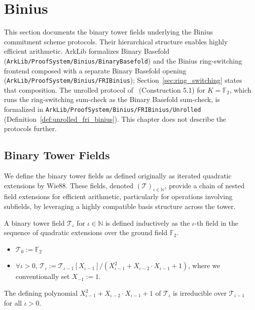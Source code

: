 \section{Binius}\label{sec:binius}

This section documents the binary tower fields underlying the Binius commitment scheme protocols. Their hierarchical structure enables highly efficient arithmetic. ArkLib formalizes Binary Basefold (\texttt{ArkLib/ProofSystem/Binius/BinaryBasefold}) and the Binius ring-switching frontend composed with a separate Binary Basefold opening (\texttt{ArkLib/ProofSystem/Binius/FRIBinius}); Section~\ref{sec:ring_switching} states that composition. The unrolled protocol of~\cite{DP24} (Construction 5.1) for $K = \mathbb{F}_2$, which runs the ring-switching sum-check as the Binary Basefold sum-check, is formalized in \texttt{ArkLib/ProofSystem/Binius/FRIBinius/Unrolled} (Definition~\ref{def:unrolled_fri_binius}). This chapter does not describe the protocols further.

\subsection{Binary Tower Fields}

We define the binary tower fields \cite{DP25} as defined originally as iterated quadratic extensions by Wie88\cite{Wie88}. These fields, denoted $(\mathcal{T})_{\iota \in \mathbb{N}}$, provide a chain of nested field extensions for efficient arithmetic, particularly for operations involving subfields, by leveraging a highly compatible basis structure across the tower.

\begin{definition}
    \leanok
    \label{def:binary_tower_field}
    A binary tower field $\mathcal{T}_{\iota}$ for $\iota \in \mathbb{N}$ is defined inductively as the $\iota$-th field in the sequence of quadratic extensions over the ground field $\mathbb{F}_2$.
    \begin{itemize}
        \item $\mathcal{T}_{0} := \mathbb{F}_{2}$
        \item $\forall \iota > 0$, $\mathcal{T}_{\iota} := \mathcal{T}_{\iota-1}[X_{\iota-1}] / (X_{\iota-1}^{2}+X_{\iota-2} \cdot X_{\iota-1}+1)$, where we conventionally set $X_{-1} := 1$.
    \end{itemize}
\end{definition}

\begin{theorem}
    \leanok
    \label{thm:binary_tower_field_irreducible}
    The defining polynomial $X_{\iota-1}^{2}+X_{\iota-2} \cdot X_{\iota-1}+1$ of $\mathcal{T}_{\iota}$ is irreducible over $\mathcal{T}_{\iota-1}$ for all $\iota > 0$.
\end{theorem}

